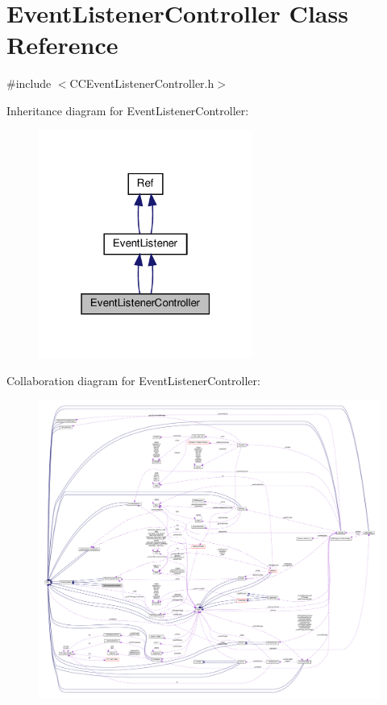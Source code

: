 \hypertarget{classEventListenerController}{}\section{Event\+Listener\+Controller Class Reference}
\label{classEventListenerController}


{\ttfamily \#include $<$C\+C\+Event\+Listener\+Controller.\+h$>$}



Inheritance diagram for Event\+Listener\+Controller\+:
\nopagebreak
\begin{figure}[H]
\begin{center}
\leavevmode
\includegraphics[width=199pt]{classEventListenerController__inherit__graph}
\end{center}
\end{figure}


Collaboration diagram for Event\+Listener\+Controller\+:
\nopagebreak
\begin{figure}[H]
\begin{center}
\leavevmode
\includegraphics[width=350pt]{classEventListenerController__coll__graph}
\end{center}
\end{figure}

